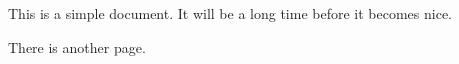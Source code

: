 \documentclass[a4paper]{amsart}
\begin{document}
This is a simple document. %
It will be a long time before it becomes nice.

\newpage

There is another page.

%
%
\end{document}
